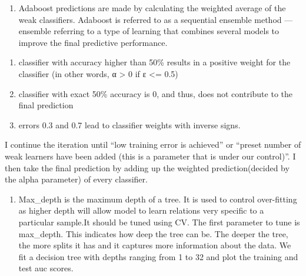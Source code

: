 \documentclass[11pt]{article}
\providecommand{\tightlist}{%
      \setlength{\itemsep}{0pt}\setlength{\parskip}{0pt}}
\begin{document}
    \begin{enumerate}
\def\labelenumi{\alph{enumi})}
\setcounter{enumi}{1}
\tightlist
\item
  Adaboost predictions are made by calculating the weighted average of
  the weak classifiers. Adaboost is referred to as a sequential ensemble
  method --- ensemble referring to a type of learning that combines
  several models to improve the final predictive performance.
\end{enumerate}

\begin{enumerate}
\def\labelenumi{\arabic{enumi})}
\tightlist
\item
  classifier with accuracy higher than 50\% results in a positive weight
  for the classifier (in other words, α \textgreater{} 0 if ε
  \textless{}= 0.5)\\
\item
  classifier with exact 50\% accuracy is 0, and thus, does not
  contribute to the final prediction\\
\item
  errors 0.3 and 0.7 lead to classifier weights with inverse signs.
\end{enumerate}

I continue the iteration until ``low training error is achieved'' or
``preset number of weak learners have been added (this is a parameter
that is under our control)''. I then take the final prediction by adding
up the weighted prediction(decided by the alpha parameter) of every
classifier.

    \begin{enumerate}
\def\labelenumi{\alph{enumi})}
\setcounter{enumi}{2}
\tightlist
\item
  Max\_depth is the maximum depth of a tree. It is used to control
  over-fitting as higher depth will allow model to learn relations very
  specific to a particular sample.It should be tuned using CV. The first
  parameter to tune is max\_depth. This indicates how deep the tree can
  be. The deeper the tree, the more splits it has and it captures more
  information about the data. We fit a decision tree with depths ranging
  from 1 to 32 and plot the training and test auc scores.
\end{enumerate}
\end{document}
